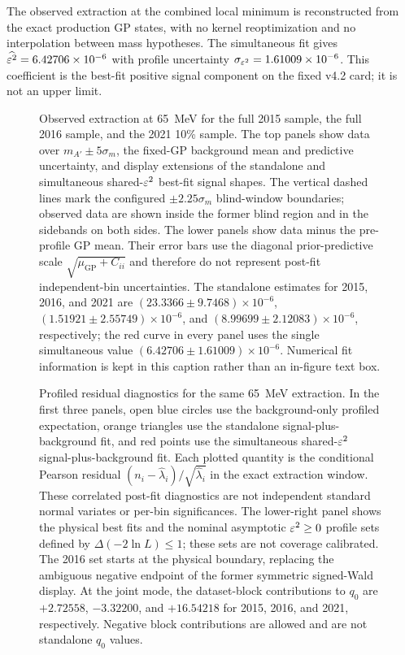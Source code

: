 The observed extraction at the combined local minimum is reconstructed from the
exact production GP states, with no kernel reoptimization and no interpolation
between mass hypotheses. The simultaneous fit gives
$\widehat{\varepsilon^2}=6.42706\times10^{-6}$ with profile uncertainty
$\sigma_{\varepsilon^2}=1.61009\times10^{-6}$. This coefficient is the best-fit
positive signal component on the fixed v4.2 card; it is not an upper limit.

\begin{figure}[H]
\centering
{}
\caption{Observed extraction at 65~MeV for the full 2015 sample, the full 2016
sample, and the 2021 10\% sample. The top panels show data over
$m_{A'}\pm5\sigma_m$, the fixed-GP background mean and predictive uncertainty,
and display extensions of the standalone and simultaneous shared-$\varepsilon^2$
best-fit signal shapes. The vertical dashed lines mark the configured
$\pm2.25\sigma_m$ blind-window boundaries; observed data are shown inside the
former blind region and in the sidebands on both sides. The lower panels show
data minus the pre-profile GP mean. Their error bars use the diagonal
prior-predictive scale $\sqrt{\mu_{\mathrm{GP}}+C_{ii}}$ and therefore do not
represent post-fit independent-bin uncertainties. The standalone estimates for
2015, 2016, and 2021 are
$(23.3366\pm9.7468)\times10^{-6}$,
$(1.51921\pm2.55749)\times10^{-6}$, and
$(8.99699\pm2.12083)\times10^{-6}$, respectively; the red curve in every panel
uses the single simultaneous value
$(6.42706\pm1.61009)\times10^{-6}$. Numerical fit information is kept in this
caption rather than an in-figure text box.}
\label{fig:results-v4p2-m065-extraction}
\end{figure}

\begin{figure}[H]
\centering
{}
\caption{Profiled residual diagnostics for the same 65~MeV extraction. In the
first three panels, open blue circles use the background-only profiled
expectation, orange triangles use the standalone signal-plus-background fit,
and red points use the simultaneous shared-$\varepsilon^2$ signal-plus-background fit.
Each plotted quantity is the conditional Pearson residual
$(n_i-\widehat{\lambda}_i)/\sqrt{\widehat{\lambda}_i}$ in the exact extraction
window. These correlated post-fit diagnostics are not independent standard
normal variates or per-bin significances. The lower-right panel shows the
physical best fits and the nominal asymptotic $\varepsilon^2\geq0$ profile sets
defined by $\Delta(-2\ln L)\leq1$; these sets are not coverage calibrated.
The 2016 set starts at the physical boundary, replacing the ambiguous negative
endpoint of the former symmetric signed-Wald display. At the joint mode, the
dataset-block contributions to $q_0$ are $+2.72558$, $-3.32200$, and
$+16.54218$ for 2015, 2016, and 2021, respectively. Negative block
contributions are allowed and are not standalone $q_0$ values.}
\label{fig:results-v4p2-m065-residuals}
\end{figure}


